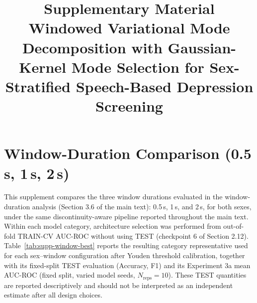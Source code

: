 \documentclass[preprint,12pt]{elsarticle}
\begin{document}
\begin{frontmatter}
\title{Supplementary Material\\[15pt]
\large Windowed Variational Mode Decomposition with Gaussian-Kernel Mode Selection for Sex-Stratified Speech-Based Depression Screening}
\vspace{-1cm}

\end{frontmatter}

\section{Window-Duration Comparison (0.5\,s, 1\,s, 2\,s)}
\label{sec:supp-window}

This supplement compares the three window durations evaluated in the window-duration analysis
(Section 3.6 of the main text): 0.5\,s, 1\,s, and 2\,s, for both sexes,
under the same discontinuity-aware pipeline reported throughout the main text. Within each model
category, architecture selection was performed from out-of-fold TRAIN-CV AUC-ROC without using
TEST (checkpoint 6 of Section 2.12). Table~\ref{tab:supp-window-best} reports the resulting
category representative used for each sex--window configuration after Youden threshold
calibration, together with its fixed-split TEST evaluation (Accuracy, F1) and its Experiment 3a
mean AUC-ROC (fixed split, varied model seeds, $N_{\text{reps}}=10$). These TEST quantities are
reported descriptively and should not be interpreted as an independent estimate after all design
choices.
\end{document}
